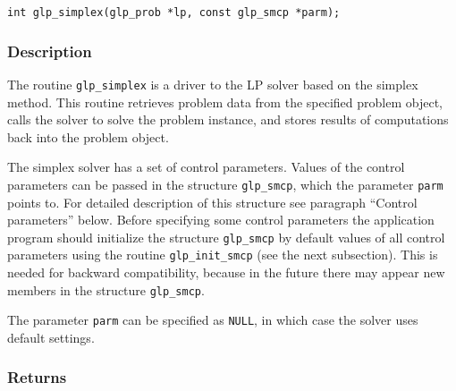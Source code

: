 \begin{verbatim}
int glp_simplex(glp_prob *lp, const glp_smcp *parm);
\end{verbatim}

\subsubsection*{Description}

The routine \verb|glp_simplex| is a driver to the LP solver based on
the simplex method. This routine retrieves problem data from the
specified problem object, calls the solver to solve the problem
instance, and stores results of computations back into the problem
object.

The simplex solver has a set of control parameters. Values of the
control parameters can be passed in the structure \verb|glp_smcp|,
which the parameter \verb|parm| points to. For detailed description of
this structure see paragraph ``Control parameters'' below.
Before specifying some control parameters the application program
should initialize the structure \verb|glp_smcp| by default values of
all control parameters using the routine \verb|glp_init_smcp| (see the
next subsection). This is needed for backward compatibility, because in
the future there may appear new members in the structure
\verb|glp_smcp|.

The parameter \verb|parm| can be specified as \verb|NULL|, in which
case the solver uses default settings.

\subsubsection*{Returns}

\def\arraystretch{1}

